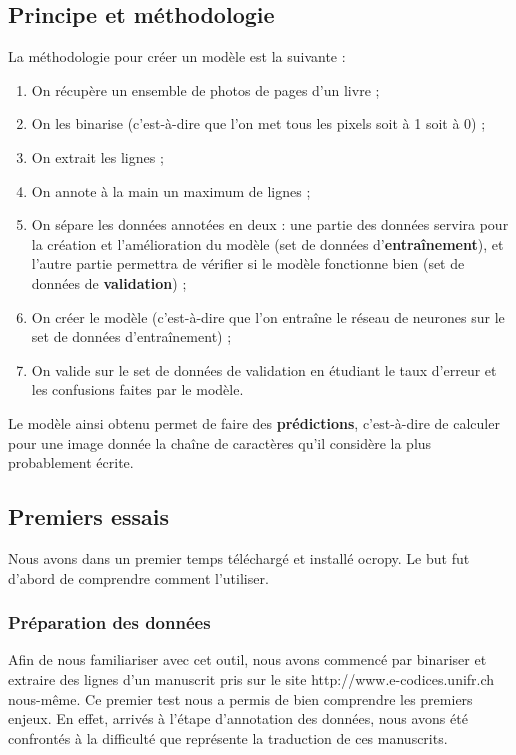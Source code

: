 \documentclass{report}
\begin{document}
\subsection{Principe et méthodologie}

La méthodologie pour créer un modèle est la suivante :

\begin{enumerate}[parsep=0.1cm,itemsep=0.1cm]
    \item On récupère un ensemble de photos de pages d'un livre ;
    \item On les binarise (c'est-à-dire que l'on met tous les pixels soit à 1 soit à 0) ;
    \item On extrait les lignes ;
    \item On annote à la main un maximum de lignes ;
    \item On sépare les données annotées en deux : une partie des données servira pour la création et l'amélioration du modèle (set de données d'\textbf{entraînement}), et l'autre partie permettra de vérifier si le modèle fonctionne bien (set de données de \textbf{validation}) ;
    \item On créer le modèle (c'est-à-dire que l'on entraîne le réseau de neurones sur le set de données d'entraînement) ;
    \item On valide sur le set de données de validation en étudiant le taux d'erreur et les confusions faites par le modèle.
\end{enumerate}

Le modèle ainsi obtenu permet de faire des \textbf{prédictions}, c'est-à-dire de calculer pour une image donnée la chaîne de caractères qu'il considère la plus probablement écrite.

\subsection{Premiers essais}

Nous avons dans un premier temps téléchargé et installé ocropy.
Le but fut d'abord de comprendre comment l'utiliser.

\subsubsection{Préparation des données}

Afin de nous familiariser avec cet outil, nous avons commencé par binariser et extraire des lignes d'un manuscrit pris sur le site http://www.e-codices.unifr.ch nous-même.
Ce premier test nous a permis de bien comprendre les premiers enjeux.
En effet, arrivés à l'étape d'annotation des données, nous avons été confrontés à la difficulté que représente la traduction de ces manuscrits.
\end{document}
